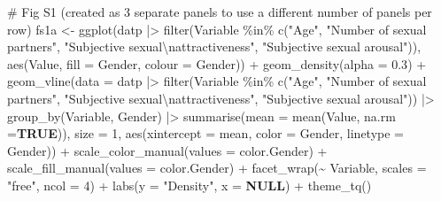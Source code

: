 \documentclass[
  bookmarksnumbered]{article}
\newenvironment{Shaded}{\begin{snugshade}}{\end{snugshade}}
\newcommand{\AttributeTok}[1]{\textcolor[rgb]{0.80,0.80,0.80}{#1}}
\newcommand{\CommentTok}[1]{\textcolor[rgb]{0.50,0.62,0.50}{#1}}
\newcommand{\ConstantTok}[1]{\textcolor[rgb]{0.86,0.64,0.64}{\textbf{#1}}}
\newcommand{\DecValTok}[1]{\textcolor[rgb]{0.86,0.86,0.80}{#1}}
\newcommand{\FloatTok}[1]{\textcolor[rgb]{0.75,0.75,0.82}{#1}}
\newcommand{\FunctionTok}[1]{\textcolor[rgb]{0.94,0.94,0.56}{#1}}
\newcommand{\NormalTok}[1]{\textcolor[rgb]{0.80,0.80,0.80}{#1}}
\newcommand{\OtherTok}[1]{\textcolor[rgb]{0.94,0.94,0.56}{#1}}
\newcommand{\SpecialCharTok}[1]{\textcolor[rgb]{0.86,0.64,0.64}{#1}}
\newcommand{\StringTok}[1]{\textcolor[rgb]{0.80,0.58,0.58}{#1}}
\begin{document}
\begin{Shaded}
\begin{Highlighting}[]
\CommentTok{\# Fig S1 (created as 3 separate panels to use a different number of panels per row)}
\NormalTok{fs1a }\OtherTok{\textless{}{-}} \FunctionTok{ggplot}\NormalTok{(datp }\SpecialCharTok{|\textgreater{}}
                 \FunctionTok{filter}\NormalTok{(Variable }\SpecialCharTok{\%in\%} \FunctionTok{c}\NormalTok{(}\StringTok{"Age"}\NormalTok{,}
                                      \StringTok{"Number of sexual partners"}\NormalTok{,}
                                      \StringTok{"Subjective sexual}\SpecialCharTok{\textbackslash{}n}\StringTok{attractiveness"}\NormalTok{,}
                                      \StringTok{"Subjective sexual arousal"}\NormalTok{)),}
             \FunctionTok{aes}\NormalTok{(Value,}
                 \AttributeTok{fill =}\NormalTok{ Gender,}
                 \AttributeTok{colour =}\NormalTok{ Gender)) }\SpecialCharTok{+}
        \FunctionTok{geom\_density}\NormalTok{(}\AttributeTok{alpha =} \FloatTok{0.3}\NormalTok{) }\SpecialCharTok{+}
        \FunctionTok{geom\_vline}\NormalTok{(}\AttributeTok{data =}\NormalTok{ datp }\SpecialCharTok{|\textgreater{}}
                     \FunctionTok{filter}\NormalTok{(Variable }\SpecialCharTok{\%in\%} \FunctionTok{c}\NormalTok{(}\StringTok{"Age"}\NormalTok{,}
                                            \StringTok{"Number of sexual partners"}\NormalTok{,}
                                            \StringTok{"Subjective sexual}\SpecialCharTok{\textbackslash{}n}\StringTok{attractiveness"}\NormalTok{,}
                                            \StringTok{"Subjective sexual arousal"}\NormalTok{)) }\SpecialCharTok{|\textgreater{}} 
                     \FunctionTok{group\_by}\NormalTok{(Variable, Gender) }\SpecialCharTok{|\textgreater{}}
                     \FunctionTok{summarise}\NormalTok{(}\AttributeTok{mean =} \FunctionTok{mean}\NormalTok{(Value, }\AttributeTok{na.rm =}\ConstantTok{TRUE}\NormalTok{)),}
                   \AttributeTok{size =} \DecValTok{1}\NormalTok{,}
                   \FunctionTok{aes}\NormalTok{(}\AttributeTok{xintercept =}\NormalTok{ mean, }\AttributeTok{color =}\NormalTok{ Gender, }\AttributeTok{linetype =}\NormalTok{ Gender)) }\SpecialCharTok{+}
        \FunctionTok{scale\_color\_manual}\NormalTok{(}\AttributeTok{values =}\NormalTok{ color.Gender) }\SpecialCharTok{+}
        \FunctionTok{scale\_fill\_manual}\NormalTok{(}\AttributeTok{values =}\NormalTok{ color.Gender) }\SpecialCharTok{+}
        \FunctionTok{facet\_wrap}\NormalTok{(}\SpecialCharTok{\textasciitilde{}}\NormalTok{ Variable,}
                   \AttributeTok{scales =} \StringTok{"free"}\NormalTok{,}
                   \AttributeTok{ncol =} \DecValTok{4}\NormalTok{) }\SpecialCharTok{+}
        \FunctionTok{labs}\NormalTok{(}\AttributeTok{y =} \StringTok{"Density"}\NormalTok{,}
             \AttributeTok{x =} \ConstantTok{NULL}\NormalTok{) }\SpecialCharTok{+}
        \FunctionTok{theme\_tq}\NormalTok{()}


\end{Highlighting}
\end{Shaded}
\end{document}
